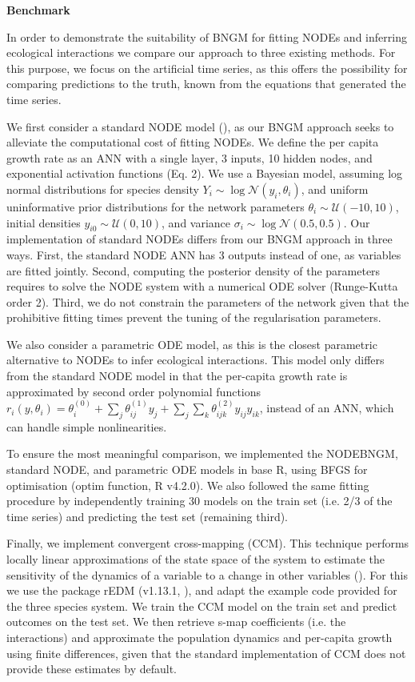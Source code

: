 \documentclass[11pt, oneside]{article}
\begin{document}
\textbf{Benchmark}

In order to demonstrate the suitability of BNGM for fitting NODEs and inferring ecological interactions we compare our approach to three existing methods.
For this purpose, we focus on the artificial time series, as this offers the possibility for comparing predictions to the truth, known from the equations that generated the time series.

We first consider a standard NODE model (\cite{Bonnaffe2021a}), as our BNGM approach seeks to alleviate the computational cost of fitting NODEs.
We define the per capita growth rate as an ANN with a single layer, 3 inputs, 10 hidden nodes, and exponential activation functions (Eq. 2).
We use a Bayesian model, assuming log normal distributions for species density $Y_i \sim \log\mathcal{N}(y_i,\theta_i)$, and uniform uninformative prior distributions for the network parameters $\theta_i \sim \mathcal{U}(-10,10)$, initial densities $y_{i0} \sim \mathcal{U}(0,10)$, and variance $\sigma_i \sim \log\mathcal{N}(0.5,0.5)$.
Our implementation of standard NODEs differs from our BNGM approach in three ways.
First, the standard NODE ANN has 3 outputs instead of one, as variables are fitted jointly.
Second, computing the posterior density of the parameters requires to solve the NODE system with a numerical ODE solver (Runge-Kutta order 2).
Third, we do not constrain the parameters of the network given that the prohibitive fitting times prevent the tuning of the regularisation parameters.

We also consider a parametric ODE model, as this is the closest parametric alternative to NODEs to infer ecological interactions.
This model only differs from the standard NODE model in that the per-capita growth rate is approximated by second order polynomial functions $r_i(y,\theta_i) = \theta_i^{(0)} + \sum_j \theta_{ij}^{(1)} y_j + \sum_j \sum_k \theta_{ijk}^{(2)} y_{ij} y_{ik}$, instead of an ANN, which can handle simple nonlinearities.

To ensure the most meaningful comparison, we implemented the NODEBNGM, standard NODE, and parametric ODE models in base R, using BFGS for optimisation (optim function, R v4.2.0).
We also followed the same fitting procedure by independently training 30 models on the train set (i.e. 2/3 of the time series) and predicting the test set (remaining third).

Finally, we implement convergent cross-mapping (CCM).
This technique performs locally linear approximations of the state space of the system to estimate the sensitivity of the dynamics of a variable to a change in other variables (\cite{Sugihara2012}).
For this we use the package rEDM (v1.13.1, \cite{Sugihara2012}), and adapt the example code provided for the three species system.
We train the CCM model on the train set and predict outcomes on the test set.
We then retrieve s-map coefficients (i.e. the interactions) and approximate the population dynamics and per-capita growth using finite differences, given that the standard implementation of CCM does not provide these estimates by default.
\end{document}
